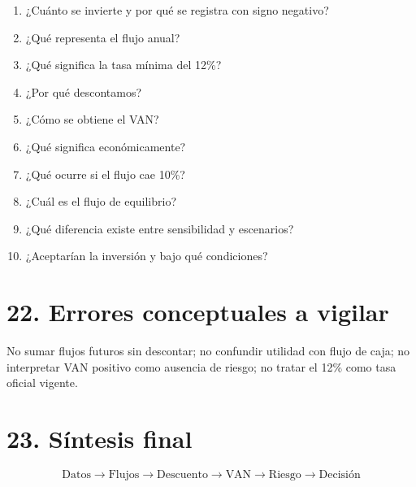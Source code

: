 \documentclass[11pt,a4paper]{article}
\begin{document}
\begin{enumerate}
\item ¿Cuánto se invierte y por qué se registra con signo negativo?
\item ¿Qué representa el flujo anual?
\item ¿Qué significa la tasa mínima del 12\%?
\item ¿Por qué descontamos?
\item ¿Cómo se obtiene el VAN?
\item ¿Qué significa económicamente?
\item ¿Qué ocurre si el flujo cae 10\%?
\item ¿Cuál es el flujo de equilibrio?
\item ¿Qué diferencia existe entre sensibilidad y escenarios?
\item ¿Aceptarían la inversión y bajo qué condiciones?
\end{enumerate}

\section*{22. Errores conceptuales a vigilar}

No sumar flujos futuros sin descontar; no confundir utilidad con flujo de caja; no interpretar VAN positivo como ausencia de riesgo; no tratar el 12\% como tasa oficial vigente.

\section*{23. Síntesis final}

\[
\boxed{\text{Datos} \rightarrow \text{Flujos} \rightarrow \text{Descuento} \rightarrow \text{VAN} \rightarrow \text{Riesgo} \rightarrow \text{Decisión}}
\]
\end{document}
